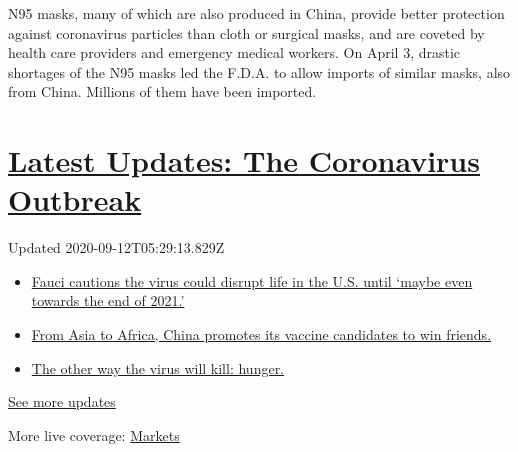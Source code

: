 N95 masks, many of which are also produced in China, provide better
protection against coronavirus particles than cloth or surgical masks,
and are coveted by health care providers and emergency medical workers.
On April 3, drastic shortages of the N95 masks led the F.D.A. to allow
imports of similar masks, also from China. Millions of them have been
imported.

\hypertarget{latest-updates-the-coronavirus-outbreak}{%
\section{\texorpdfstring{\href{https://www.nytimes3xbfgragh.onion/2020/09/11/world/covid-19-coronavirus.html?action=click\&pgtype=Article\&state=default\&region=MAIN_CONTENT_1\&context=storylines_live_updates}{Latest
Updates: The Coronavirus
Outbreak}}{Latest Updates: The Coronavirus Outbreak}}\label{latest-updates-the-coronavirus-outbreak}}

Updated 2020-09-12T05:29:13.829Z

\begin{itemize}
\tightlist
\item
  \href{https://www.nytimes3xbfgragh.onion/2020/09/11/world/covid-19-coronavirus.html?action=click\&pgtype=Article\&state=default\&region=MAIN_CONTENT_1\&context=storylines_live_updates\#link-dfb8a16}{Fauci
  cautions the virus could disrupt life in the U.S. until `maybe even
  towards the end of 2021.'}
\item
  \href{https://www.nytimes3xbfgragh.onion/2020/09/11/world/covid-19-coronavirus.html?action=click\&pgtype=Article\&state=default\&region=MAIN_CONTENT_1\&context=storylines_live_updates\#link-7104d154}{From
  Asia to Africa, China promotes its vaccine candidates to win friends.}
\item
  \href{https://www.nytimes3xbfgragh.onion/2020/09/11/world/covid-19-coronavirus.html?action=click\&pgtype=Article\&state=default\&region=MAIN_CONTENT_1\&context=storylines_live_updates\#link-393ad215}{The
  other way the virus will kill: hunger.}
\end{itemize}

\href{https://www.nytimes3xbfgragh.onion/2020/09/11/world/covid-19-coronavirus.html?action=click\&pgtype=Article\&state=default\&region=MAIN_CONTENT_1\&context=storylines_live_updates}{See
more updates}

More live coverage:
\href{https://www.nytimes3xbfgragh.onion/live/2020/09/11/business/stock-market-today-coronavirus?action=click\&pgtype=Article\&state=default\&region=MAIN_CONTENT_1\&context=storylines_live_updates}{Markets}

